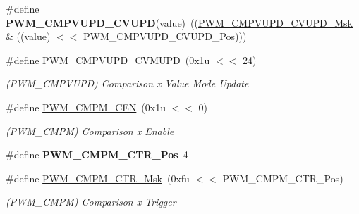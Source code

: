 \begin{DoxyCompactItemize}
\mbox{\label{group__SAMS70__PWM_ga289a10af1c9e1d2817c5394ca5ab052f}} 
\#define {\bfseries P\+W\+M\+\_\+\+C\+M\+P\+V\+U\+P\+D\+\_\+\+C\+V\+U\+PD}(value)~((\mbox{\hyperlink{group__SAMV71__PWM_ga814522233f8137b734c794b115c82d08}{P\+W\+M\+\_\+\+C\+M\+P\+V\+U\+P\+D\+\_\+\+C\+V\+U\+P\+D\+\_\+\+Msk}} \& ((value) $<$$<$ P\+W\+M\+\_\+\+C\+M\+P\+V\+U\+P\+D\+\_\+\+C\+V\+U\+P\+D\+\_\+\+Pos)))
\item 
\mbox{\label{group__SAMS70__PWM_ga588c81afa5376f6abb27ce1dbe05578f}} 
\#define \mbox{\hyperlink{group__SAMS70__PWM_ga588c81afa5376f6abb27ce1dbe05578f}{P\+W\+M\+\_\+\+C\+M\+P\+V\+U\+P\+D\+\_\+\+C\+V\+M\+U\+PD}}~(0x1u $<$$<$ 24)
\begin{DoxyCompactList}\small\item\em (P\+W\+M\+\_\+\+C\+M\+P\+V\+U\+PD) Comparison x Value Mode Update \end{DoxyCompactList}\item 
\mbox{\label{group__SAMS70__PWM_gad3f9538f09a306acf682d98930f2a954}} 
\#define \mbox{\hyperlink{group__SAMS70__PWM_gad3f9538f09a306acf682d98930f2a954}{P\+W\+M\+\_\+\+C\+M\+P\+M\+\_\+\+C\+EN}}~(0x1u $<$$<$ 0)
\begin{DoxyCompactList}\small\item\em (P\+W\+M\+\_\+\+C\+M\+PM) Comparison x Enable \end{DoxyCompactList}\item 
\mbox{\label{group__SAMS70__PWM_gaf57626ea1939e8f352300ecf93be1439}} 
\#define {\bfseries P\+W\+M\+\_\+\+C\+M\+P\+M\+\_\+\+C\+T\+R\+\_\+\+Pos}~4
\item 
\mbox{\label{group__SAMS70__PWM_ga32b8e7533c5db154116c6f8797e18bdc}} 
\#define \mbox{\hyperlink{group__SAMS70__PWM_ga32b8e7533c5db154116c6f8797e18bdc}{P\+W\+M\+\_\+\+C\+M\+P\+M\+\_\+\+C\+T\+R\+\_\+\+Msk}}~(0xfu $<$$<$ P\+W\+M\+\_\+\+C\+M\+P\+M\+\_\+\+C\+T\+R\+\_\+\+Pos)
\begin{DoxyCompactList}\small\item\em (P\+W\+M\+\_\+\+C\+M\+PM) Comparison x Trigger \end{DoxyCompactList}\item 
\mbox{\label{group__SAMS70__PWM_gac20d4465cd3dc1f875cfe5060df67630}} 

\end{DoxyCompactItemize}
